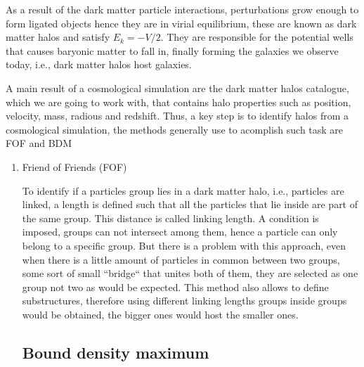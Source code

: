 As a result of the dark matter particle interactions, perturbations 
grow enough to form ligated objects hence they are in virial equilibrium,
these are known as dark matter halos and satisfy $E_k=-V/2$. 
They are responsible for the potential wells that causes baryonic matter 
to fall in, finally forming the galaxies we observe today, i.e., dark
matter halos host galaxies. 

A main result of a cosmological simulation are the dark matter halos 
catalogue, which we are going to work with, that contains halo properties such
as position, velocity, mass, radious and redshift. Thus, a key step is to identify 
halos from a cosmological simulation, the methods generally use to acomplish such 
task are FOF and BDM 

\begin{enumerate}

\subsection{ Friends of friends }

\item Friend of Friends (FOF) 

To identify if a particles group lies in a dark matter halo, i.e., particles 
are linked, a length is defined such that all the particles that lie inside 
are part of the same group. This distance is called linking length. A condition 
is imposed, groups can not intersect among them, hence a particle can only belong 
to a specific group. But there is a problem with this approach, even when there is 
a little amount of particles in common between two groups, some sort of small 
``bridge`` that unites both of them, they are selected as one group not two
as would be expected. This method also allows to define substructures, therefore using
different linking lengths groups inside groups would be obtained, the bigger ones
would host the smaller ones. 

\subsection{ Bound density maximum }


\end{enumerate}
